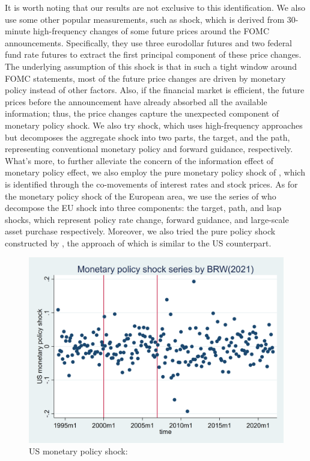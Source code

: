 It is worth noting that our results are not exclusive to this identification. We also use some other popular measurements, such as \cite{nakamura2018high} shock, which is derived from 30-minute high-frequency changes of some future prices around the FOMC announcements. Specifically, they use three eurodollar futures and two federal fund rate futures to extract the first principal component of these price changes. The underlying assumption of this shock is that in such a tight window around FOMC statements, most of the future price changes are driven by monetary policy instead of other factors. Also, if the financial market is efficient, the future prices before the announcement have already absorbed all the available information; thus, the price changes capture the unexpected component of monetary policy shock. We also try \cite{guraynak2005actions} shock, which uses high-frequency approaches but decomposes the aggregate shock into two parts, the target, and the path, representing conventional monetary policy and forward guidance, respectively. What's more, to further alleviate the concern of the information effect of monetary policy effect, we also employ the pure monetary policy shock of \cite{jarocinski2020deconstructing}, which is identified through the co-movements of interest rates and stock prices. As for the monetary policy shock of the European area, we use the series of \cite{miranda2022tale} who decompose the EU shock into three components: the target, path, and lsap shocks, which represent policy rate change, forward guidance, and large-scale asset purchase respectively. Moreover, we also tried the pure policy shock constructed by \cite{jarocinski2020deconstructing}, the approach of which is similar to the US counterpart.

\begin{figure}[H]
    \centering
    \includegraphics[width=\textwidth]{latex/drafts/pic/BRW.png}
    \caption{\small US monetary policy shock: \cite{bu2021unified}}
    \label{fig: BRW}
\end{figure}


